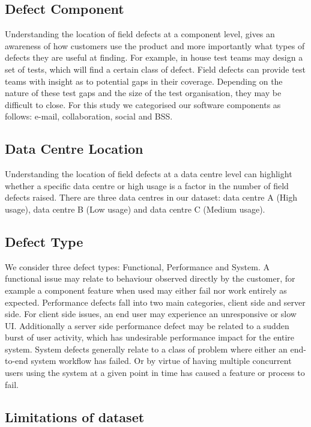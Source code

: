 \documentclass[conference]{IEEEtran}
\begin{document}
\subsection{Defect Component}

Understanding the location of field defects at a component level, gives an awareness of how customers use the product and more importantly what types of defects they are useful at finding. For example, in house test teams may design a set of tests, which will find a certain class of defect. Field defects can provide test teams with insight as to potential gaps in their coverage. Depending on the nature of these test gaps and the size of the test organisation, they may be difficult to close. For this study we categorised our software components as follows: e-mail, collaboration, social and BSS.

\subsection{Data Centre Location}

Understanding the location of field defects at a data centre level can highlight whether a specific data centre or high usage is a factor in the number of field defects raised. There are three data centres in our dataset: data centre A (High usage), data centre B (Low usage) and data centre C (Medium usage).

\subsection{Defect Type}

We consider three defect types: Functional, Performance and System. A functional issue may relate to behaviour observed directly by the customer, for example a component feature when used may either fail nor work entirely as expected. 
Performance defects fall into two main categories, client side and server side. For client side issues, an end user may experience an unresponsive or slow UI. Additionally a server side performance defect may be related to a sudden burst of user activity, which has undesirable performance impact for the entire system.
System defects generally relate to a class of problem where either an end-to-end system workflow has failed. Or by virtue of having multiple concurrent users using the system at a given point in time has caused a feature or process to fail.

\subsection{Limitations of dataset}
\end{document}

